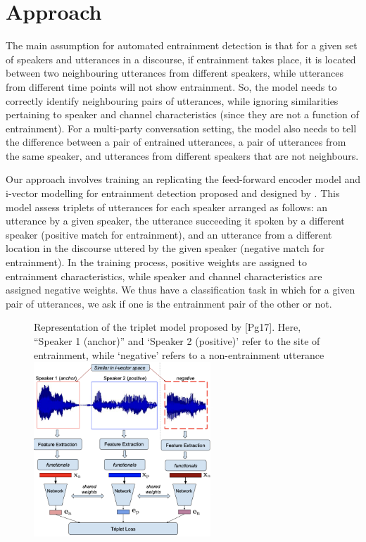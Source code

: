 \section{Approach}
    The main assumption for automated entrainment detection is that for a given set of speakers and utterances in a discourse, if entrainment takes place, it is located between two neighbouring utterances from different speakers, while utterances from different time points will not show entrainment. So, the model needs to correctly identify neighbouring pairs of utterances, while ignoring similarities pertaining to speaker and channel characteristics (since they are not a function of entrainment). For a multi-party conversation setting, the model also needs to tell the difference between a pair of entrained utterances, a pair of utterances from the same speaker, and utterances from different speakers that are not neighbours.

    Our approach involves training an replicating the feed-forward encoder model and i-vector modelling for entrainment detection proposed and designed by \citeauthor{nasir2020}. This model assess triplets of utterances for each speaker arranged as follows: an utterance by a given speaker, the utterance succeeding it spoken by a different speaker (positive match for entrainment), and an utterance from a different location in the discourse uttered by the given speaker (negative match for entrainment). In the training process, positive weights are assigned to entrainment characteristics, while speaker and channel characteristics are assigned negative weights. We thus have a classification task in which for a given pair of utterances, we ask if one is the entrainment pair of the other or not.

    \begin{figure}
    \begin{sidecaption}{Representation of the triplet model proposed by \citeauthor{nasir2020}[Pg17]. Here, ``Speaker 1 (anchor)'' and `Speaker 2 (positive)' refer to the site of entrainment, while `negative' refers to a non-entrainment utterance}
    \centering
    \includegraphics[width=0.6\textwidth]{images/triplet-model.png}
    \label{fig:sentiment_model_schematics}
    \end{sidecaption}
    \end{figure}

